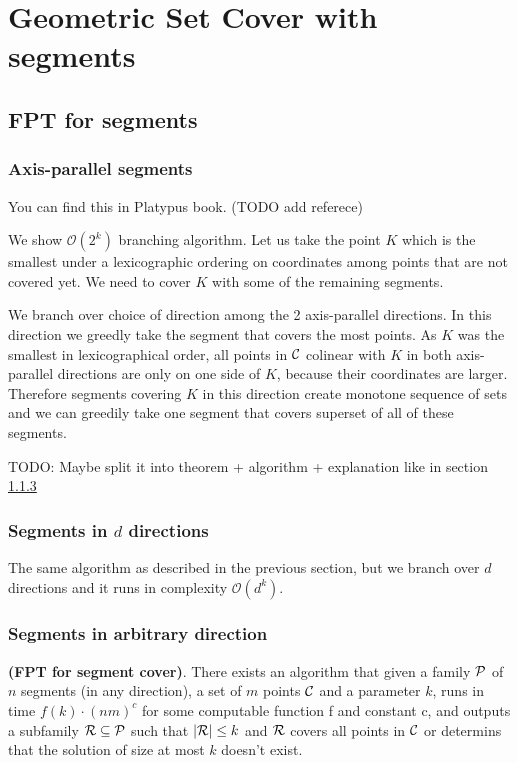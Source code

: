 \chapter{Geometric Set Cover with segments}

\section{FPT for segments}
\subsection{Axis-parallel segments}
You can find this in Platypus book. (TODO add referece)

We show $\mathcal{O}(2^k)$ branching algorithm.
Let us take
the point $K$ which is the smallest under a lexicographic ordering on coordinates
among points that are not covered yet.
We need to cover $K$ with some of the remaining segments.

We branch over choice of direction among the 2 axis-parallel directions.
In this direction we greedly take the segment that covers
the most points. As $K$ was the smallest
in lexicographical order, all points in $\mathcal{C}$ colinear with $K$
in both axis-parallel directions 
are only on one side of $K$, because their coordinates are larger.
Therefore
segments covering $K$ in this direction create monotone sequence
of sets and we can greedily take one segment that covers
superset of all of these segments.

TODO: Maybe split it into theorem + algorithm + explanation like in 
section
\ref{segments_in_arbitrary_direction}

\subsection{Segments in $d$ directions}
The same algorithm as described in the previous section,
but we branch over $d$ directions and it runs in complexity $\mathcal{O}(d^k)$.

\subsection{Segments in arbitrary direction}
\label{segments_in_arbitrary_direction}
\begin{tw}{
	\label{segment_cover_fpt}
	\textbf{(FPT for segment cover)}.
	There exists an algorithm that given a family $\mathcal{P}$ of
	$n$ segments (in any direction),
	a set of $m$ points $\mathcal{C}$
	and a parameter $k$,
	runs in time $f(k) \cdot (nm)^c$ for some computable function f and constant c,
	and outputs a subfamily $\mathcal{R} \subseteq \mathcal{P}$
	such that $|\mathcal{R}| \le k$ and $\mathcal{R}$ covers all points in $\mathcal{C}$
	or determins that the solution of size at most $k$ doesn't exist.
}\end{tw}

